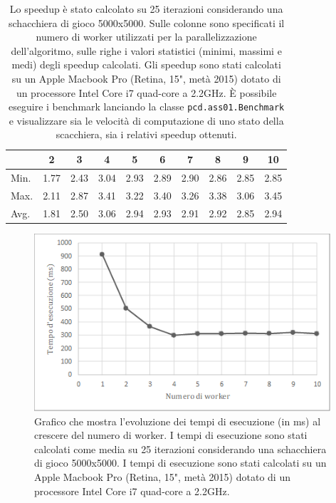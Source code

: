 \documentclass[a4paper]{article}
\begin{document}
\begin{table}[H]
\centering
\begin{tabular}{l|ccccccccc}
\hline
     & 2     & 3    & 4    & 5    & 6    & 7    & 8    & 9    & 10   \\ \hline
Min. & 1.77  & 2.43 & 3.04 & 2.93 & 2.89 & 2.90 & 2.86 & 2.85 & 2.85 \\
Max. & 2.11  & 2.87 & 3.41 & 3.22 & 3.40 & 3.26 & 3.38 & 3.06 & 3.45 \\
Avg. & 1.81  & 2.50 & 3.06 & 2.94 & 2.93 & 2.91 & 2.92 & 2.85 & 2.94 \\ \hline
\end{tabular}
\caption{Lo speedup è stato calcolato su 25 iterazioni considerando una schacchiera di gioco 5000x5000. Sulle colonne sono specificati il numero di worker utilizzati per la parallelizzazione dell'algoritmo, sulle righe i valori statistici (minimi, massimi e medi) degli speedup calcolati. Gli speedup sono stati calcolati su un Apple Macbook Pro (Retina, 15", metà 2015) dotato di un processore Intel Core i7 quad-core a 2.2GHz.
È possibile eseguire i benchmark lanciando la classe \texttt{pcd.ass01.Benchmark} e visualizzare sia le velocità di computazione di uno stato della scacchiera, sia i relativi speedup ottenuti.}
\label{speedup-table}
\end{table}

\begin{figure}[H]
    \centering
    \includegraphics[width=110mm]{res/execution_times.png}
    \caption{Grafico che mostra l'evoluzione dei tempi di esecuzione (in ms) al crescere del numero di worker. I tempi di esecuzione sono stati calcolati come media su 25 iterazioni considerando una schacchiera di gioco 5000x5000. I tempi di esecuzione sono stati calcolati su un Apple Macbook Pro (Retina, 15", metà 2015) dotato di un processore Intel Core i7 quad-core a 2.2GHz.}
    \label{fig:execution-times}
\end{figure}

\end{document}

